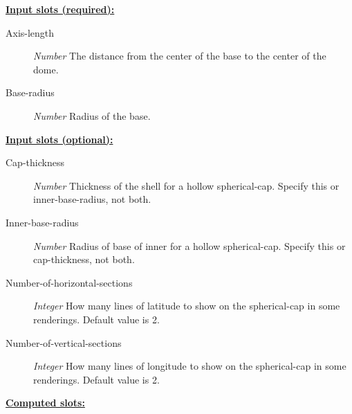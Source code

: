 \documentclass [11pt]{book}
\begin{document}
\begin{itemize}
\begin{description}
\end{description}








\textbf{
\underline{Input slots (required):}}

\begin{description}

\item [Axis-length]
\emph{Number} The distance from the center of the base to the center of the dome.


\item [Base-radius]
\emph{Number} Radius of the base.


\end{description}






\textbf{
\underline{Input slots (optional):}}

\begin{description}

\item [Cap-thickness]
\emph{Number} Thickness of the shell for a hollow spherical-cap. Specify this
or inner-base-radius, not both.


\item [Inner-base-radius]
\emph{Number} Radius of base of inner for a hollow spherical-cap. Specify this
or cap-thickness, not both.


\item [Number-of-horizontal-sections]
\emph{Integer} How many lines of latitude to show on the spherical-cap in some renderings. Default value is 2.


\item [Number-of-vertical-sections]
\emph{Integer} How many lines of longitude to show on the spherical-cap in some renderings. Default value is 2.


\end{description}






\textbf{
\underline{Computed slots:}}

\begin{description}


\end{description}
\end{itemize}
\end{document}
